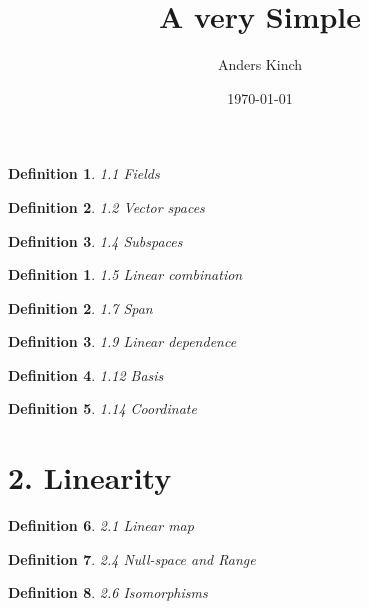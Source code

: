 \documentclass[12pt]{article}
\title{A very Simple}
\author{Anders Kinch}
\date{\today}
\theoremstyle{plain}
\newtheorem*{definition*}{Definition}
\newtheorem{definition}{Definition}
\begin{document}
\maketitle

\section{}

\begin{definition*} 
  1.1 Fields
\end{definition*}

\begin{definition*} 
 1.2 Vector spaces 
\end{definition*}

\begin{definition*} 
  1.4 Subspaces 
\end{definition*}


\begin{definition} 
 1.5 Linear combination 
\end{definition}


\begin{definition} 
 1.7 Span 
\end{definition}


\begin{definition} 
 1.9 Linear dependence 
\end{definition}



\begin{definition} 
 1.12 Basis 
\end{definition}


\begin{definition} 
 1.14 Coordinate 
\end{definition}

\section{2. Linearity}


\begin{definition} 
 2.1 Linear map 
\end{definition}


\begin{definition} 
 2.4 Null-space and Range 
\end{definition}

\begin{definition} 
 2.6 Isomorphisms
\end{definition}
\end{document}
